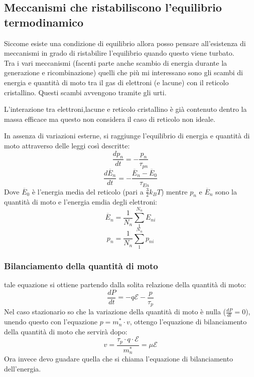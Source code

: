 \subsection{Meccanismi che ristabiliscono l'equilibrio termodinamico}
Siccome esiste una condizione di equilibrio allora posso pensare all'esistenza di meccanismi in grado di ristabilire l'equilibrio quando questo viene turbato.\\
Tra i vari meccanismi (facenti parte anche scambio di energia durante la generazione e ricombinazione) quelli che più mi interessano sono gli scambi di energia e quantità di moto tra il gas di elettroni (e lacune) con il reticolo cristallino.
Questi scambi avvengono tramite gli urti.
%
\begin{exbox}
    L'interazione tra elettroni,lacune e reticolo cristallino è già contenuto dentro la massa efficace ma questo non considera il caso di reticolo non ideale.
\end{exbox}
%
In assenza di variazioni esterne, si raggiunge l'equilibrio di energia e quantità di moto  attraverso delle leggi così descritte:
%
\begin{equation}
    \dfrac{dp_n}{dt}=-\dfrac{p_n}{\tau_{pn}}
\end{equation}
%
\begin{equation}
    \dfrac{d\overline{E}_n}{dt}=-\dfrac{\overline{E}_n-\overline{E}_0}{\tau_{En}}
\end{equation}
%
Dove $\overline{E}_0$ è l'energia media del reticolo (pari a $\frac{3}{2}k_BT$) mentre $p_n$ e $\overline{E}_n$ sono la quantità di moto e l'energia emdia degli elettroni:
%
\begin{equation*}
    \overline{E}_n=\dfrac{1}{N_n}\sum_1^{N_n}E_{ni}
\end{equation*}
%
\begin{equation*}
    p_n=\dfrac{1}{N_n}\sum_1^{N_n}p_{ni}
\end{equation*}
%
\cleardoublepage
\subsubsection{Bilanciamento della quantità di moto}
tale equazione si ottiene partendo dalla solita relazione della quantità di moto:
%
\begin{equation}
    \dfrac{dP}{dt}=-q\mathcal{E}-\dfrac{p}{\tau_p}
\end{equation}
%
 Nel caso stazionario so che la variazione della quantità di moto è nulla ($\frac{dP}{dt}=0$), unendo questo con l'equazione $p=m_n^* \cdot v$, ottengo l'equazione di bilanciamento della quantità di moto che servirà dopo:
\begin{equation}
     v=\dfrac{\tau_p \cdot q \cdot \mathcal{E}}{m_n^*}=\mu \mathcal{E}
\end{equation}
%
Ora invece devo guadare quella che si chiama l'equazione di bilanciamento dell'energia.
%
